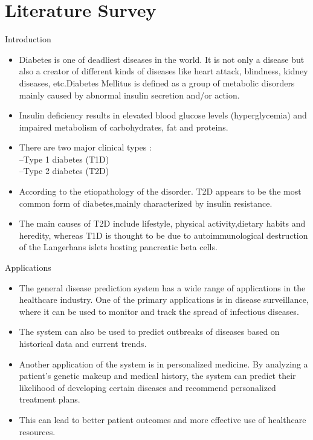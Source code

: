 \documentclass{SKP-beamer}
\begin{document}

\section{\textbf{Literature Survey}}

\begin{frame}{Introduction}
	\begin{itemize}
		\item Diabetes is one of deadliest diseases in the
		world. It is not only a disease but also a creator of
		different kinds of diseases like heart attack,
		blindness, kidney diseases, etc.Diabetes Mellitus is defined as a group of metabolic
		disorders mainly caused by abnormal insulin
		secretion and/or action. 
		\item Insulin deficiency results in
		elevated blood glucose levels (hyperglycemia) and
		impaired metabolism of carbohydrates, fat and
		proteins.
		\item There are two major clinical types : \\ 
		--Type 1 diabetes (T1D) \\
		--Type 2 diabetes (T2D) 
		\item According to the etiopathology
		of the disorder. T2D appears to be the most common
		form of diabetes,mainly characterized by insulin resistance. 
		\item The main causes of T2D include lifestyle, physical activity,dietary habits and heredity, whereas T1D is thought to be due to autoimmunological destruction of the Langerhans islets hosting pancreatic beta cells.	
		
	\end{itemize}
\end{frame}
\begin{frame}{Applications}
	\begin{itemize}
		\item The general disease prediction system has a wide range of applications in the healthcare industry. One of the primary applications is in disease surveillance, where it can be used to monitor and track the spread of infectious diseases. 
		\item The system can also be used to predict outbreaks of diseases based on historical data and current trends.
		\item Another application of the system is in personalized medicine. By analyzing a patient's genetic makeup and medical history, the system can predict their likelihood of developing certain diseases and recommend personalized treatment plans. 
		\item This can lead to better patient outcomes and more effective use of healthcare resources.
	\end{itemize}
\end{frame}
\end{document}
